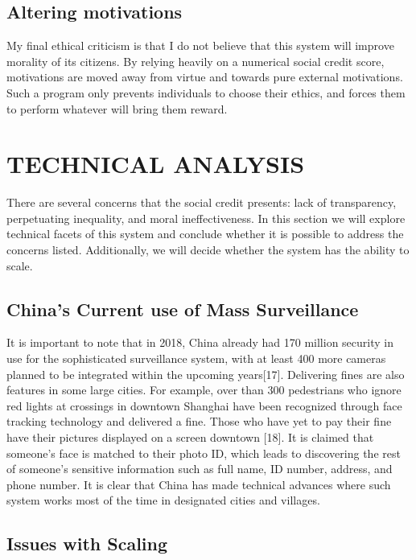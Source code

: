\documentclass[letterpaper, 10 pt, conference]{ieeeconf}  %
\begin{document}
\subsection{Altering motivations}

My final ethical criticism is that I do not believe that this system will improve morality of its citizens. By relying heavily on a numerical social credit score, motivations are moved away from virtue and towards pure external motivations. Such a program only prevents individuals to choose their ethics, and forces them to perform whatever will bring them reward.
\section{TECHNICAL ANALYSIS}
There are several concerns that the social credit presents: lack of transparency, perpetuating inequality, and moral ineffectiveness. In this section we will explore technical facets of this system and conclude whether it is possible to address the concerns listed. Additionally, we will decide whether the system has the ability to scale.
\subsection{China's Current use of Mass Surveillance}

It is important to note that in 2018, China already had 170 million security in use for the sophisticated surveillance system, with at least 400 more cameras planned to be integrated within the upcoming years[17].  Delivering fines are also features in some large cities. For example, over than 300 pedestrians who ignore red lights at crossings in downtown Shanghai have been recognized through face tracking technology and delivered a fine. Those who have yet to pay their fine have their pictures displayed on a screen downtown [18]. It is claimed that someone’s face is matched to their photo ID, which leads to discovering the rest of someone’s sensitive information such as full name, ID number, address, and phone number. It is clear that China has made technical advances where such system works most of the time in designated cities and villages.
\subsection{Issues with Scaling}
\end{document}
